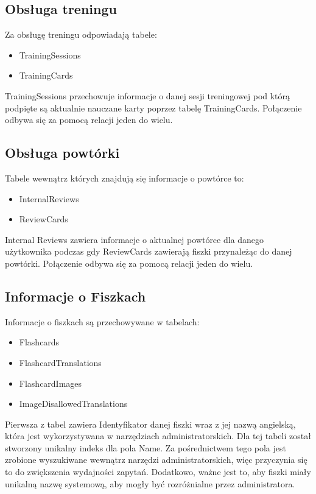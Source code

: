 \subsection{Obsługa treningu}

Za obsługę treningu odpowiadają tabele:

\begin{itemize}
	\item TrainingSessions
	\item TrainingCards
\end{itemize}

TrainingSessions przechowuje informacje o danej sesji treningowej pod którą podpięte są aktualnie nauczane karty poprzez tabelę TrainingCards. Połączenie odbywa się za pomocą relacji jeden do wielu.

\subsection{Obsługa powtórki}

Tabele wewnątrz których znajdują się informacje o powtórce to:

\begin{itemize}
	\item InternalReviews
	\item ReviewCards
\end{itemize}

Internal Reviews zawiera informacje o aktualnej powtórce dla danego użytkownika podczas gdy ReviewCards zawierają fiszki przynależąc do danej powtórki. Połączenie odbywa się za pomocą relacji jeden do wielu.

\subsection{Informacje o Fiszkach}

Informacje o fiszkach są przechowywane w tabelach:

\begin{itemize}
	\item Flashcards
	\item FlashcardTranslations
	\item FlashcardImages
	\item ImageDisallowedTranslations
\end{itemize}

Pierwsza z tabel zawiera Identyfikator danej fiszki wraz z jej nazwą angielską, która jest wykorzystywana w narzędziach administratorskich. Dla tej tabeli został stworzony unikalny indeks dla pola Name. Za pośrednictwem tego pola jest zrobione wyszukiwane wewnątrz narzędzi administratorskich, więc przyczynia się to do zwiększenia wydajności zapytań. Dodatkowo, ważne jest to, aby fiszki miały unikalną nazwę systemową, aby mogły być rozróżnialne przez administratora.

